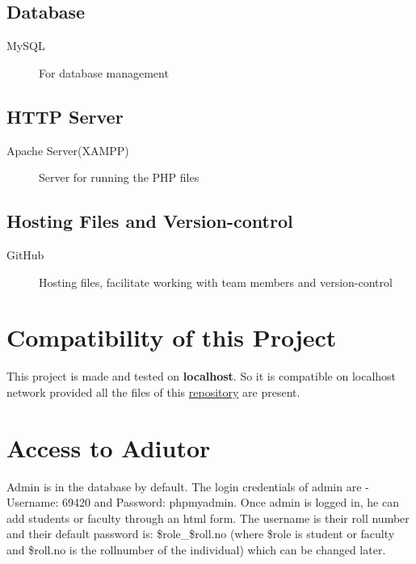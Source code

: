 \documentclass[12pt]{article}
\begin{document}
\subsection{Database}
\begin{description}
    \item[MySQL] For database management
\end{description}

\subsection{HTTP Server}
\begin{description}
    \item[Apache Server(XAMPP)] Server for running the PHP files
\end{description}

\subsection{Hosting Files and Version-control}
\begin{description}
    \item[GitHub] Hosting files, facilitate working with team members and version-control
\end{description}

\section{Compatibility of this Project}
This project is made and tested on \textbf{localhost}. So it is compatible on localhost network provided all the files of this  \href{https://github.com/samiitdh/SSL_Project}{repository} are present.

\section{Access to Adiutor}
Admin is in the database by default. The login credentials of admin are - Username: 69420 and Password: phpmyadmin. Once admin is logged in, he can add students or faculty through an html form. The username is their roll number and their default password is: \$role\_\$roll.no (where \$role is student or faculty and \$roll.no is the rollnumber of the individual) which can be changed later.
\end{document}

